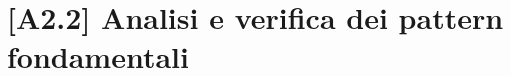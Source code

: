 \documentclass[10pt]{beamer}
\begin{document}
	
	\section{[A2.2] Analisi e verifica dei pattern fondamentali}
\end{document}
